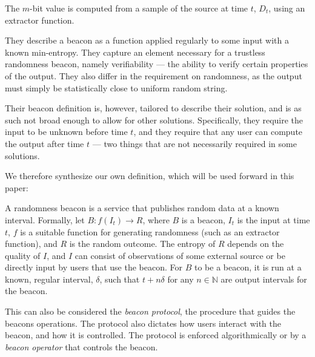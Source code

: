 The $m$-bit value is computed from a sample of the source at time $t$, $D_t$, using an extractor function. 

They describe a beacon as a function applied regularly to some input with a known min-entropy.
They capture an element necessary for a trustless randomness beacon, namely verifiability --- the ability to verify certain properties of the output.
They also differ in the requirement on randomness, as the output must simply be statistically close to uniform random string.

Their beacon definition is, however, tailored to describe their solution, and is as such not broad enough to allow for other solutions.
Specifically, they require the input to be unknown before time $t$, and they require that any user can compute the output after time $t$ --- two things that are not necessarily required in some solutions.


We therefore synthesize our own definition, which will be used forward in this paper:

A  randomness beacon is a service that publishes random data at a known interval.
Formally, let $B: f(I_t) \rightarrow R$, where $B$ is a beacon, $I_t$ is the input at time $t$, $f$ is a suitable function for generating randomness (such as an extractor function), and $R$ is the random outcome. The entropy of $R$ depends on the quality of $I$, and $I$ can consist of observations of some external source or be directly input by users that use the beacon.
For $B$ to be a beacon, it is run at a known, regular interval, $\delta$, such that $t+n\delta$ for any $n \in \mathbb{N}$ are output intervals for the beacon.

This can also be considered the \emph{beacon protocol}, the procedure that guides the beacons operations. The protocol also dictates how users interact with the beacon, and how it is controlled. The protocol is enforced algorithmically or by a \emph{beacon operator} that controls the beacon.



